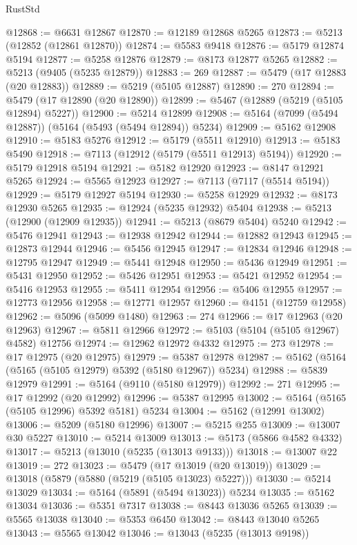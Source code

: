 \begin{lexlean}{RustStd}
\begin{coremodule}
@12868 := @6631 @12867
@12870 := @12189 @12868 @5265
@12873 := @5213 (@12852 (@12861 @12870))
@12874 := @5583 @9418
@12876 := @5179 @12874 @5194
@12877 := @5258 @12876
@12879 := @8173 @12877 @5265
@12882 := @5213 (@9405 (@5235 @12879))
@12883 := 269
@12887 := @5479 (@17 @12883 (@20 @12883))
@12889 := @5219 (@5105 @12887)
@12890 := 270
@12894 := @5479 (@17 @12890 (@20 @12890))
@12899 := @5467 (@12889 (@5219 (@5105 @12894) @5227))
@12900 := @5214 @12899
@12908 := @5164 (@7099 (@5494 @12887)) (@5164 (@5493 (@5494 @12894)) @5234)
@12909 := @5162 @12908
@12910 := @5183 @5276
@12912 := @5179 (@5511 @12910)
@12913 := @5183 @5490
@12918 := @7113 (@12912 (@5179 (@5511 @12913) @5194))
@12920 := @5179 @12918 @5194
@12921 := @5182 @12920
@12923 := @8147 @12921 @5265
@12924 := @5565 @12923
@12927 := @7113 (@7117 (@5514 @5194))
@12929 := @5179 @12927 @5194
@12930 := @5258 @12929
@12932 := @8173 @12930 @5265
@12935 := @12924 (@5235 @12932) @5404
@12938 := @5213 (@12900 (@12909 @12935))
@12941 := @5213 (@8679 @5404) @5240
@12942 := @5476 @12941
@12943 := @12938 @12942
@12944 := @12882 @12943
@12945 := @12873 @12944
@12946 := @5456 @12945
@12947 := @12834 @12946
@12948 := @12795 @12947
@12949 := @5441 @12948
@12950 := @5436 @12949
@12951 := @5431 @12950
@12952 := @5426 @12951
@12953 := @5421 @12952
@12954 := @5416 @12953
@12955 := @5411 @12954
@12956 := @5406 @12955
@12957 := @12773 @12956
@12958 := @12771 @12957
@12960 := @4151 (@12759 @12958)
@12962 := @5096 (@5099 @1480)
@12963 := 274
@12966 := @17 @12963 (@20 @12963)
@12967 := @5811 @12966
@12972 := @5103 (@5104 (@5105 @12967) @4582) @12756
@12974 := @12962 @12972 @4332
@12975 := 273
@12978 := @17 @12975 (@20 @12975)
@12979 := @5387 @12978
@12987 := @5162 (@5164 (@5165 (@5105 @12979) @5392 (@5180 @12967)) @5234)
@12988 := @5839 @12979
@12991 := @5164 (@9110 (@5180 @12979))
@12992 := 271
@12995 := @17 @12992 (@20 @12992)
@12996 := @5387 @12995
@13002 := @5164 (@5165 (@5105 @12996) @5392 @5181) @5234
@13004 := @5162 (@12991 @13002)
@13006 := @5209 (@5180 @12996)
@13007 := @5215 @255
@13009 := @13007 @30 @5227
@13010 := @5214 @13009
@13013 := @5173 (@5866 @4582 @4332)
@13017 := @5213 (@13010 (@5235 (@13013 @9133)))
@13018 := @13007 @22
@13019 := 272
@13023 := @5479 (@17 @13019 (@20 @13019))
@13029 := @13018 (@5879 (@5880 (@5219 (@5105 @13023) @5227)))
@13030 := @5214 @13029
@13034 := @5164 (@5891 (@5494 @13023)) @5234
@13035 := @5162 @13034
@13036 := @5351 @7317
@13038 := @8443 @13036 @5265
@13039 := @5565 @13038
@13040 := @5353 @6450
@13042 := @8443 @13040 @5265
@13043 := @5565 @13042
@13046 := @13043 (@5235 (@13013 @9198))

\end{coremodule}
\end{lexlean}

